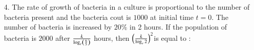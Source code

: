 \documentclass[journal,12pt,onecolumn]{IEEEtran}
\theoremstyle{remark}
\begin{document}
\begin{enumerate}
	\item[4.] The rate of growth of bacteria in a culture is proportional to the number of bacteria present and the bacteria cout is $1000$ at initial time $t = 0$. The number of bacteria is increased by $20\%$ in 2 hours. If the population of bacteria is $2000$ after $\frac{k}{\log_e \left(\frac{6}{5}\right)}$ hours, then $\left(\frac{k}{\log_e 2}\right)^2 $is equal to :
		\begin{enumerate}
		\end{enumerate}


\end{enumerate}
\end{document}
